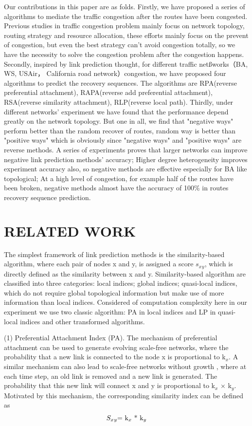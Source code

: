 \documentclass[onecolumn,preprintnumbers,amsmath,amssymb]{revtex4}
\begin{document}
Our contributions in this paper are as folds. 
Firstly, we have proposed a series of algorithms to mediate the traffic congestion after the routes have been congested. 
Previous studies in traffic congestion problem mainly focus on network topology, routing strategy and resource allocation, these efforts mainly focus on the prevent of congestion, but even the best strategy can't avoid congestion totally, so we have the necessity to solve the congestion problem after the congestion happens. 
Secondly, inspired by link prediction thought, for different traffic netßworks（BA, WS, USAir， California road network）congestion, we have proposed four algorithms to predict the recovery sequences. 
The algorithms are RPA(reverse preferential attachment), RAPA(reverse add preferential attachment), RSA(reverse similarity attachment), RLP(reverse local path).
Thirdly, under different networks' experiment we have found that the performance depend greatly on the network topology.
But one in all, we find that "negative ways" perform better than the random recover of routes, random way is better than "positive ways" which is obviously since "negative ways" and "positive ways" are reverse methods.
A series of experiments proves that larger networks can improve negative link prediction methods' accuracy; 
Higher degree heterogeneity improves experiment accuracy also, so negative methods are effective especially for BA like topological; 
At a high level of congestion, for example half of the routes have been broken, negative methods almost have the accuracy of 100\% in routes recovery sequence prediction.



\section*{RELATED WORK\protect}
The simplest framework of link prediction methods is the similarity-based algorithm, where each pair of nodes x and y, is assigned a score $s_x$$_y$, which is directly defined as the similarity between x and y. Similarity-based algorithm are classified into three categories: local indices; global indices; quasi-local indices, which do not require global topological information but make use of more information than local indices\cite{SV}. Considered of computation complexity here in our experiment we use two classic algorithm: PA in local indices and LP in quasi-local indices and other transformed algorithms.

(1) Preferential Attachment Index (PA)\cite{WG}. The mechanism of preferential attachment can be used to generate evolving scale-free networks, where the probability that a new link is connected to the node x is proportional to k$_x$. A similar mechanism can also lead to scale-free networks without growth , where at each time step, an old link is removed and a new link is generated. The probability that this new link will connect x and y is proportional to k$_x$ × k$_y$. Motivated by this mechanism, the corresponding similarity index can be defined as
\begin{equation}
\centerline{
$S_x$$_y$=
k$_x$ * k$_y$
}
\end{equation}
\end{document}
